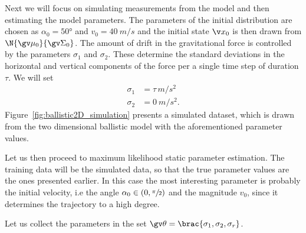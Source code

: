 Next we will focus on simulating measurements from the model and then estimating
the model parameters. The parameters of the initial distribution are chosen as
$\alpha_0 = \ang{50}$ and $v_0 = \SI{40}{m/s}$ and the initial state $\x_0$ is then
drawn from $\N{\gv\mu_0}{\gv\Sigma_0}$. The amount of drift in the gravitational force 
is controlled by the parameters $\sigma_1$ and $\sigma_2$.
These determine the standard deviations in the horizontal and vertical
components of the force per a single time step of duration $\tau$.
We will set 
\begin{align}
	\sigma_1&=\tau\,\si{m/s^2}\\
	\sigma_2&=\SI{0}{m/s^2}.
\end{align} 
%
Figure~\ref{fig:ballistic2D_simulation} presents  a simulated dataset, 
which is drawn from the two dimensional ballistic model with the aforementioned parameter
values.

Let us then proceed to maximum likelihood static parameter estimation. The training
data will be the simulated data, so that the true parameter values are the ones presented
earlier. In this case the most interesting parameter is probably the initial velocity,
i.e the angle $\alpha_0\in(0,\sfrac{\pi}{2})$ and the magnitude $v_0$, since it determines
the trajectory to a high degree.

 
Let us collect the parameters in the set $\Th=\brac{\sigma_1,\sigma_2,\sigma_r}$.

\parencite{ristic2004beyond,Ratna2008,Lindsten2010}

 

